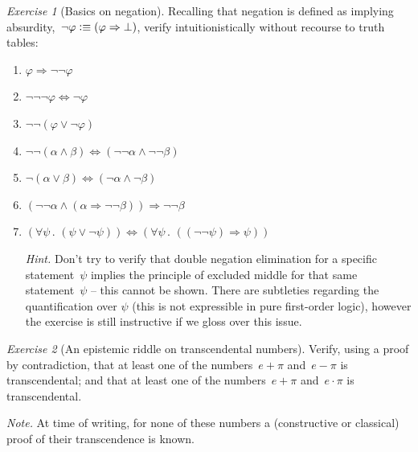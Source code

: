 \documentclass[10pt,reqno,a4paper,openany]{amsbook}
\theoremstyle{definition}
\theoremstyle{plain}
\theoremstyle{remark}
\newcommand{\?}{\,{:}\,}
\renewcommand{\_}{\mathpunct{.}\,}
\newcommand{\defequiv}{\vcentcolon\equiv}
\newtheorem{exercise}{Exercise}[chapter]
\begin{document}
\begin{exercise}[Basics on negation]
Recalling that negation is defined as implying absurdity,~$\neg\varphi
\defequiv (\varphi \Rightarrow \bot)$, verify intuitionistically without
recourse to truth tables:
\begin{enumerate}
\item $\varphi \Rightarrow \neg\neg\varphi$
\item $\neg\neg\neg\varphi \Leftrightarrow \neg\varphi$
\item $\neg\neg(\varphi \vee \neg\varphi)$
\item $\neg\neg(\alpha \wedge \beta) \Leftrightarrow (\neg\neg\alpha \wedge
\neg\neg\beta)$
\item $\neg(\alpha \vee \beta) \Longleftrightarrow (\neg\alpha \wedge \neg\beta)$
\item $(\neg\neg\alpha \wedge (\alpha \Rightarrow \neg\neg\beta)) \Longrightarrow
\neg\neg\beta$
\item $(\forall\psi\_ (\psi \vee \neg\psi))
\Longleftrightarrow (\forall\psi\_ ((\neg\neg\psi) \Rightarrow
\psi))$

{\noindent\scriptsize\emph{Hint.}
Don't try to verify that double negation elimination for a specific
statement~$\psi$ implies the principle of excluded middle for that same
statement~$\psi$ -- this cannot be shown. There are subtleties regarding the
quantification over $\psi$ (this is not expressible in pure first-order logic),
however the exercise is still instructive if we gloss over this issue.\par}
\end{enumerate}
\end{exercise}

\begin{exercise}[An epistemic riddle on transcendental numbers]
Verify, using a proof by contradiction, that at least one of the numbers~$e +
\pi$ and~$e - \pi$ is transcendental; and that at least one of the
numbers~$e + \pi$ and~$e \cdot \pi$ is transcendental.

{\noindent\scriptsize\emph{Note.} At time of writing, for none of these numbers
a (constructive or classical) proof of their transcendence is known.\par}
\end{exercise}
\end{document}
